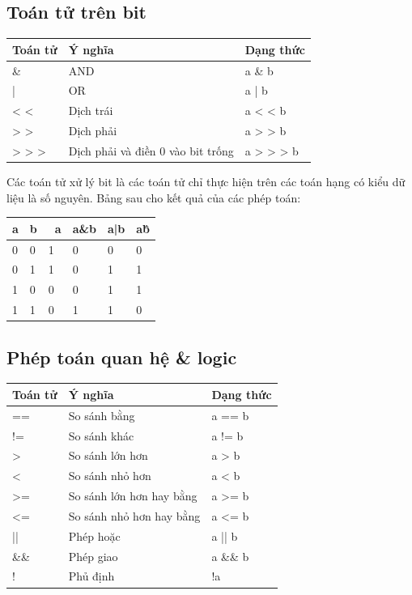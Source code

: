 \subsection{Toán tử trên bit}
\begin{center}
\centering
\begin{tabular}{ lll}
\hline
Toán tử&Ý nghĩa&Dạng thức\\
\hline
\& &AND&a \& b\\
\hline
| &OR&a | b\\
\hline
< < &Dịch trái&a < < b\\
\hline
> > &Dịch phải&a > > b\\
\hline
> > > &Dịch phải và điền 0 vào bit trống&a > > > b\\
\hline
\end{tabular}
\end{center}
\indent Các toán tử xử lý bit là các toán tử chỉ thực hiện trên các toán hạng có kiểu dữ liệu là số nguyên. Bảng sau cho kết quả của các phép toán:\\
\begin{center}
\begin{tabular}{ llllll}
\hline
a&b&~a&a\&b&a|b&a\^b\\
\hline
0&0&1&0&0&0\\
\hline
0&1&1&0&1&1\\
\hline
1&0&0&0&1&1\\
\hline
1&1&0&1&1&0\\
\hline
\end{tabular}
\end{center}
\subsection{Phép toán quan hệ \& logic}
\begin{center}
\begin{tabular}{ lll}
\hline
Toán tử&Ý nghĩa&Dạng thức\\
\hline
== &So sánh bằng&a == b\\
\hline
!= &So sánh khác&a != b\\
\hline
> &So sánh lớn hơn&a > b\\
\hline
< &So sánh nhỏ hơn&a < b\\
\hline
>= &So sánh lớn hơn hay bằng&a >= b\\
\hline
<= &So sánh nhỏ hơn hay bằng&a <= b\\
\hline
||&Phép hoặc&a || b\\
\hline
\&\&&Phép giao&a \&\& b\\
\hline
!&Phủ định&!a\\
\hline

\end{tabular}
\end{center}

